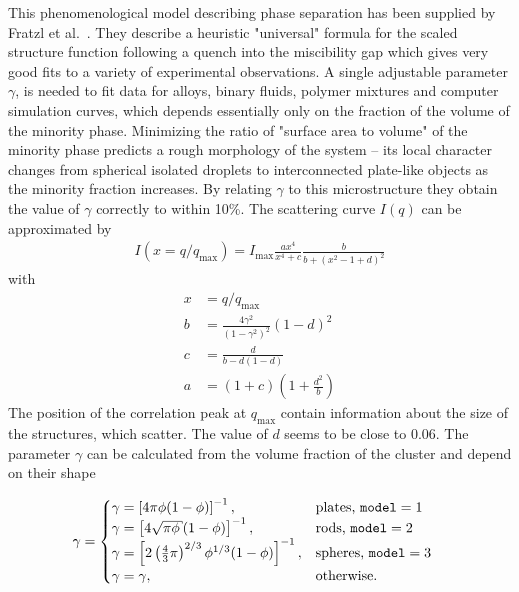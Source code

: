 This phenomenological model describing phase separation has been supplied by Fratzl et al.\ \cite{Fratzl1989}.
They describe a heuristic "universal" formula for the scaled structure function following
a quench into the miscibility gap which gives very good fits to a variety of experimental observations. A
single adjustable parameter $\gamma$, is needed to fit data for alloys, binary fluids, polymer mixtures and computer
simulation curves, which depends essentially only on the fraction of the volume of the minority phase. Minimizing
the ratio of "surface area to volume" of the minority phase predicts a rough morphology of the system -- its
local character changes from spherical isolated droplets to interconnected plate-like objects as the minority
fraction increases. By relating $\gamma$ to this microstructure they obtain the value of $\gamma$ correctly to within 10\%.
 The scattering curve $I(q)$ can be approximated by
\begin{align}
\label{eq:spinodal2}
I(x=q/q_\mathrm{max}) = I_\text{max} \frac{ax^4}{x^4+c} \frac{b}{b+\left(x^2-1+d\right)^2}
\end{align}
with
\begin{align}
  x &= q/q_\text{max} \\
  b &= \frac{4\gamma^2}{\left(1-\gamma^2\right)^2} \left(1-d\right)^2 \\
  c &= \frac{d}{b-d(1-d)} \\
  a &= (1+c) \left(1+\frac{d^2}{b}\right)
\end{align}
The position of the correlation peak at $q_\text{max}$ contain
information about the size of the structures, which scatter. The value of $d$ seems to
be close to 0.06.
The parameter $\gamma$ can be calculated from the volume fraction of the cluster and depend on their shape

\begin{align}\label{eq:gamma_phi}
  \gamma &=
  \begin{cases}
    \gamma=\left[4\pi\phi(1-\phi)\right]^{-1}, & \mbox{plates, \texttt{model}}=1 \\
    \gamma=\left[4\sqrt{\pi\phi}(1-\phi)\right]^{-1}, & \mbox{rods, \texttt{model}}=2 \\
    \gamma=\left[2\left(\frac43\pi\right)^{2/3}\phi^{1/3}(1-\phi)\right]^{-1}, & \mbox{spheres, \texttt{model}}=3 \\
    \gamma=\gamma, & \mbox{otherwise}.
  \end{cases}
\end{align}


